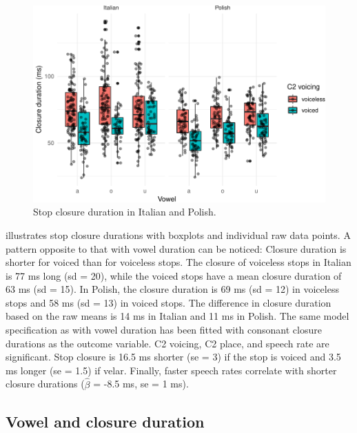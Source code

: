 \documentclass[preprint]{JASAnew}
\begin{document}
\begin{figure}
\includegraphics{2018-jasa_files/figure-latex/closure-plot-1} \caption{Stop closure duration in Italian and Polish.}\label{f:closure-plot}
\end{figure}

 illustrates stop closure durations with boxplots
and individual raw data points. A pattern opposite to that with vowel
duration can be noticed: Closure duration is shorter for voiced than for
voiceless stops. The closure of voiceless stops in Italian is 77 ms long
(sd = 20), while the voiced stops have a mean closure duration of 63 ms
(sd = 15). In Polish, the closure duration is 69 ms (sd = 12) in
voiceless stops and 58 ms (sd = 13) in voiced stops. The difference in
closure duration based on the raw means is 14 ms in Italian and 11 ms in
Polish. The same model specification as with vowel duration has been
fitted with consonant closure durations as the outcome variable. C2
voicing, C2 place, and speech rate are significant. Stop closure is 16.5
ms shorter (se = 3) if the stop is voiced and 3.5 ms longer (se = 1.5)
if velar. Finally, faster speech rates correlate with shorter closure
durations (\(\hat{\beta}\) = -8.5 ms, se = 1 ms).

\hypertarget{vowel-and-closure-duration}{%
\subsection{Vowel and closure
duration}\label{vowel-and-closure-duration}}
\end{document}
